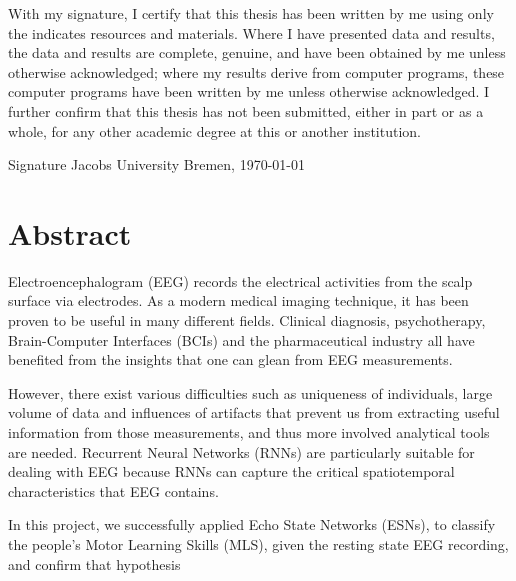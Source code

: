 \documentclass[a4paper,11pt,oneside]{article}
\begin{document}
With my signature, I certify that this thesis has been written by me
using only the indicates resources and materials. Where I have
presented data and results, the data and results are complete,
genuine, and have been obtained by me unless otherwise acknowledged;
where my results derive from computer programs, these computer
programs have been written by me unless otherwise acknowledged. I
further confirm that this thesis has not been submitted, either in
part or as a whole, for any other academic degree at this or another
institution.

\vspace{20mm}

Signature \hfill Jacobs University Bremen, \today

\newpage

\section*{Abstract}
Electroencephalogram (EEG) 
 records the electrical activities 
from the scalp surface via electrodes. As a modern medical imaging technique, 
it has been proven to be useful in many different fields. Clinical diagnosis, 
psychotherapy, Brain-Computer Interfaces (BCIs)  and the pharmaceutical industry all have 
benefited from the insights that one can glean from EEG measurements.

However, there exist various difficulties such as uniqueness of individuals, large volume of 
data and influences of artifacts that prevent us from extracting useful information from those 
measurements, and thus more involved analytical tools are needed. Recurrent Neural Networks (RNNs) 
are particularly suitable for dealing with EEG because RNNs can capture the critical spatiotemporal characteristics
that EEG contains.

In this project, we successfully applied
 Echo State Networks (ESNs),  to classify 
 the  people's Motor Learning Skills (MLS),  given the resting state EEG recording, and confirm that hypothesis 

\newpage
\tableofcontents

\clearpage
{}

\end{document}
